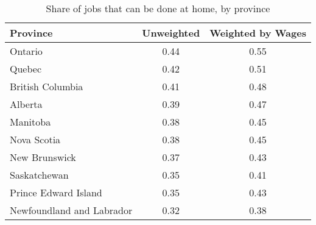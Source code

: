 \begin{table}[ht]
\centering
\caption{Share of jobs that can be done at home, by province} 
\label{tab:provinces}
\begin{tabular}{lcc}
  \hline
Province & Unweighted & Weighted by Wages \\ 
  \hline
Ontario & 0.44 & 0.55 \\ 
  Quebec & 0.42 & 0.51 \\ 
  British Columbia & 0.41 & 0.48 \\ 
  Alberta & 0.39 & 0.47 \\ 
  Manitoba & 0.38 & 0.45 \\ 
  Nova Scotia & 0.38 & 0.45 \\ 
  New Brunswick & 0.37 & 0.43 \\ 
  Saskatchewan & 0.35 & 0.41 \\ 
  Prince Edward Island & 0.35 & 0.43 \\ 
  Newfoundland and Labrador & 0.32 & 0.38 \\ 
   \hline
\end{tabular}
\end{table}
